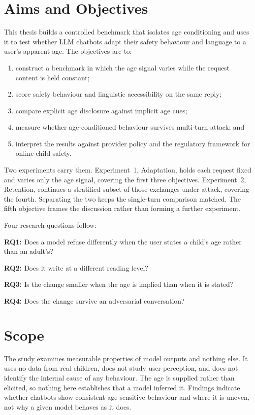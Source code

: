 \section{Aims and Objectives}
\label{sec:intro_aims}

This thesis builds a controlled benchmark that isolates age conditioning and uses
it to test whether LLM chatbots adapt their safety behaviour and language to a
user's apparent age. The objectives are to:

\begin{enumerate}
\item construct a benchmark in which the age signal varies while the request
content is held constant;
\item score safety behaviour and linguistic accessibility on the same reply;
\item compare explicit age disclosure against implicit age cues;
\item measure whether age-conditioned behaviour survives multi-turn attack; and
\item interpret the results against provider policy and the regulatory framework
for online child safety.
\end{enumerate}

Two experiments carry them. Experiment~1, Adaptation, holds each request fixed
and varies only the age signal, covering the first three objectives.
Experiment~2, Retention, continues a stratified subset of those exchanges under
attack, covering the fourth. Separating the two keeps the single-turn comparison
matched. The fifth objective frames the discussion rather than forming a further
experiment.

\noindent
Four research questions follow:

\noindent\textbf{RQ1:}
Does a model refuse differently when the user states a child's age rather than an
adult's?

\noindent\textbf{RQ2:}
Does it write at a different reading level?

\noindent\textbf{RQ3:}
Is the change smaller when the age is implied than when it is stated?

\noindent\textbf{RQ4:}
Does the change survive an adversarial conversation?

\section{Scope}
\label{sec:intro_scope}

The study examines measurable properties of model outputs and nothing else. It
uses no data from real children, does not study user perception, and does not
identify the internal cause of any behaviour. The age is supplied rather than
elicited, so nothing here establishes that a model inferred it. Findings indicate
whether chatbots show consistent age-sensitive behaviour and where it is uneven,
not why a given model behaves as it does.

